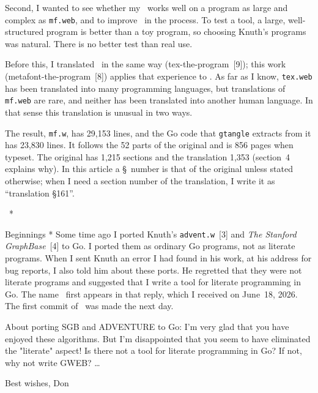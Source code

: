 Second, I wanted to see whether my \GWEB\ works well on a program as
large and complex as {\tt mf.web}, and to improve \GWEB\ in the
process. To test a tool, a large, well-structured program is better
than a toy program, so choosing Knuth's programs was natural. There is
no better test than real use.

Before this, I translated \TP\ in the same way
(tex-the-program~[9]); this work (metafont-the-program~[8]) applies
that experience to \MF. As far as I know, {\tt tex.web} has been
translated into many programming languages, but translations of
{\tt mf.web} are rare, and neither has been translated into another
human language. In that sense this translation is unusual in two ways.

The result, {\tt mf.w}, has 29,153 lines, and the Go code that
{\tt gtangle} extracts from it has 23,830 lines. It follows the 52
parts of the original and is 856 pages when typeset. The original has
1,215 sections and the translation 1,353 (section~4 explains why). In
this article a \S\ number is that of the original unless stated
otherwise; when I need a section number of the translation, I write it
as ``translation \S161''.

\quad \GWEB\ *

\subhead * Beginnings *
Some time ago I ported Knuth's {\tt advent.w}~[3] and
{\sl The Stanford GraphBase\/}~[4] to Go. I ported them as ordinary Go
programs, not as literate programs. When I sent Knuth an error I had
found in his work, at his address for bug reports, I also told him
about these ports. He regretted that they were not literate programs
and suggested that I write a tool for literate programming in Go. The
name \GWEB\ first appears in that reply, which I received on June~18,
2026. The first commit of \GWEB\ was made the next day.

{\narrower\smallskip\noindent\ninepoint\tt\raggedright
About porting SGB and ADVENTURE to Go: I'm very glad that
you have enjoyed these algorithms. But I'm disappointed that you seem to have
eliminated the "literate" aspect! Is there not a tool for literate
programming in Go? If not, why not write GWEB? \dots\par\smallskip
\noindent Best wishes, Don\smallskip}

